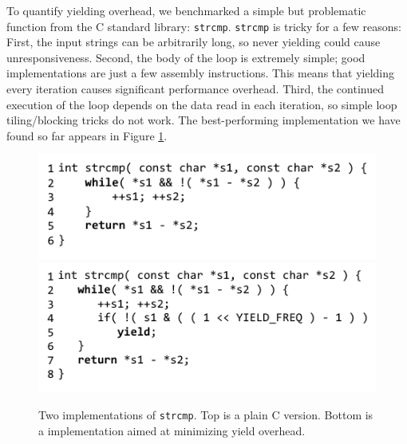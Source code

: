 \documentclass[sigplan,10pt,review,anonymous]{acmart}\settopmatter{printfolios=true,printccs=false,printacmref=false}
\begin{document}
To quantify yielding overhead, we benchmarked a simple but problematic function from the C standard library: \texttt{strcmp}.
\texttt{strcmp} is tricky for a few reasons:
First, the input strings can be arbitrarily long, so never yielding could cause unresponsiveness.
Second, the body of the loop is extremely simple; good implementations are just a few assembly instructions.
This means that yielding every iteration causes significant performance overhead.
Third, the continued execution of the loop depends on the data read in each iteration, so simple loop tiling/blocking tricks do not work.
The best-performing implementation we have found so far appears in Figure \ref{fig:strcmp}.

\begin{figure}[htp]
\includegraphics[left]{plain_strcmp}%
  \\
\includegraphics[left]{strcmp_benchmark}%
\caption{Two implementations of \texttt{strcmp}.
  Top is a plain C version.
  Bottom is a \charcoal{} implementation aimed at minimizing yield overhead.}

\label{fig:strcmp}

\end{figure}


\end{document}
